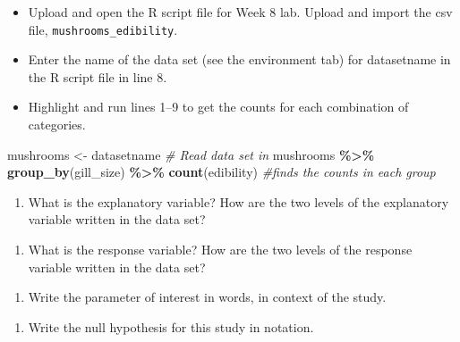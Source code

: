 \documentclass[
]{report}
\newenvironment{Shaded}{\begin{snugshade}}{\end{snugshade}}
\newcommand{\CommentTok}[1]{\textcolor[rgb]{0.56,0.35,0.01}{\textit{#1}}}
\newcommand{\FunctionTok}[1]{\textcolor[rgb]{0.13,0.29,0.53}{\textbf{#1}}}
\newcommand{\NormalTok}[1]{#1}
\newcommand{\OtherTok}[1]{\textcolor[rgb]{0.56,0.35,0.01}{#1}}
\newcommand{\SpecialCharTok}[1]{\textcolor[rgb]{0.81,0.36,0.00}{\textbf{#1}}}
\providecommand{\tightlist}{%
  \setlength{\itemsep}{0pt}\setlength{\parskip}{0pt}}
\begin{document}
\begin{itemize}
\item
  Upload and open the R script file for Week 8 lab. Upload and import the csv file, \texttt{mushrooms\_edibility}.
\item
  Enter the name of the data set (see the environment tab) for datasetname in the R script file in line 8.
\item
  Highlight and run lines 1--9 to get the counts for each combination of categories.
\end{itemize}

\begin{Shaded}
\begin{Highlighting}[]
\NormalTok{mushrooms }\OtherTok{\textless{}{-}}\NormalTok{ datasetname }\CommentTok{\# Read data set in}
\NormalTok{mushrooms }\SpecialCharTok{\%\textgreater{}\%} \FunctionTok{group\_by}\NormalTok{(gill\_size) }\SpecialCharTok{\%\textgreater{}\%} \FunctionTok{count}\NormalTok{(edibility) }\CommentTok{\#finds the counts in each group}
\end{Highlighting}
\end{Shaded}

\begin{enumerate}
\def\labelenumi{\arabic{enumi}.}
\tightlist
\item
  What is the explanatory variable? How are the two levels of the explanatory variable written in the data set?
\end{enumerate}

\vspace{0.5in}

\begin{enumerate}
\def\labelenumi{\arabic{enumi}.}
\setcounter{enumi}{1}
\tightlist
\item
  What is the response variable? How are the two levels of the response variable written in the data set?
\end{enumerate}

\vspace{0.5in}

\begin{enumerate}
\def\labelenumi{\arabic{enumi}.}
\setcounter{enumi}{2}
\tightlist
\item
  Write the parameter of interest in words, in context of the study.
\end{enumerate}

\vspace{1in}

\begin{enumerate}
\def\labelenumi{\arabic{enumi}.}
\setcounter{enumi}{3}
\tightlist
\item
  Write the null hypothesis for this study in notation.
\end{enumerate}
\end{document}
